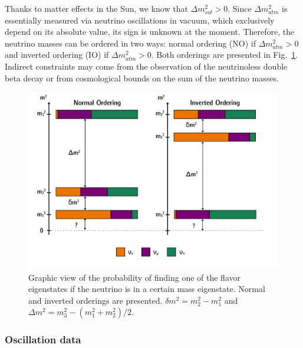 Thanks to matter effects in the Sun, we know that $\Delta m^2_{sol}>0$.
Since $\Delta m^2_{atm}$ is essentially measured via neutrino oscillations in vacuum, which exclusively depend on its absolute value, its sign is unknown at the moment.
Therefore, the neutrino masses can be ordered in two ways: normal ordering (NO) if $\Delta m^2_{atm}>0$ and inverted ordering (IO) if $\Delta m^2_{atm}>0$.
Both orderings are presented in Fig.~\ref{fig:IO_NO}.
Indirect constraints may come from the observation of the neutrinoless double beta decay or from cosmological bounds on the sum of the neutrino masses.
\begin{figure}[h!]
  \centering
  \includegraphics[width=1\textwidth]{neutrinophysics/fig_neutrinophysics/IO_NO.pdf}
  \caption{Graphic view of the probability of finding one of the flavor eigenstates if the neutrino is in a certain mass eigenstate.
    Normal and inverted orderings are presented.
    ${\delta m^2=m_2^2-m_1^2}$ and ${\Delta m^2=m_3^2-(m_1^2+m_2^2)/2}$.
    \label{fig:IO_NO}}
\end{figure}

\subsubsection*{Oscillation data}

